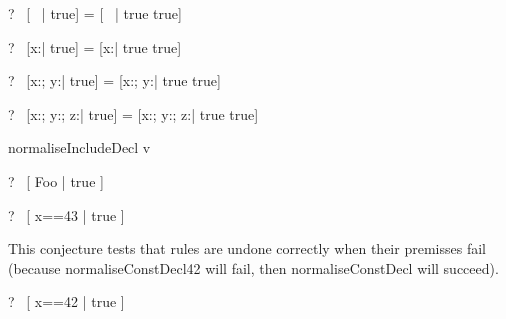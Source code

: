 \begin{zed}
  \vdash?~ [~ | true] = [~ | true \land true]
\end{zed}

\begin{zed}
  \vdash?~ [x:\nat | true] = [x:\nat | true \land true]
\end{zed}

\begin{zed}
  \vdash?~ [x:\nat ; y:\nat | true] = [x:\nat ; y:\nat | true \land true]
\end{zed}

\begin{zed}
  \vdash?~ [x:\nat ; y:\nat ; z:\nat | true] =
           [x:\nat ; y:\nat ; z:\nat | true \land true]
\end{zed}



\begin{zedrule}{normaliseIncludeDecl}
   v \hasDefn [D1 | P1] \\
\derives
   [v; D | true] \unfoldsTo [D1 | P1 \land P2]
\end{zedrule}

\begin{zed}
  \vdash?~ [ Foo | true ] 
\end{zed}


\begin{zed}
  \vdash?~ [ x==43 | true ] \unfoldsTo [ x:\{43\} | true ]
\end{zed}

This conjecture tests that rules are undone correctly when their
premisses fail (because normaliseConstDecl42 will fail, then
normaliseConstDecl will succeed).
\begin{zed}
  \vdash?~ [ x==42 | true ] \unfoldsTo [ x:\{42\} | true ]
\end{zed}